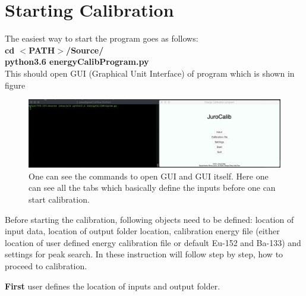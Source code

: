 \documentclass{article}
\begin{document}
\section{Starting  Calibration}
The easiest way to start the program goes as follows:\\
\textbf{ cd $<$PATH$>$/Source/ }\\
\textbf{ python3.6 energyCalibProgram.py }\\
This should open GUI (Graphical Unit Interface) of program which is shown in figure 
\begin{figure}
	\centering
	\includegraphics[width=1\linewidth]{GUI}
	\caption{One can see the commands to open GUI and GUI itself. Here one can see all the tabs which basically define the inputs before one can start calibration.}
	\label{fig:gui}
\end{figure}
Before starting the calibration, following objects need to be defined: location of input data, location of output folder location, calibration energy file (either location of user defined energy calibration file or default Eu-152 and Ba-133) and settings for peak search. In these instruction will follow  step by step, how to proceed to calibration.

\textbf{First} user defines the location of inputs and output folder.
\end{document}
